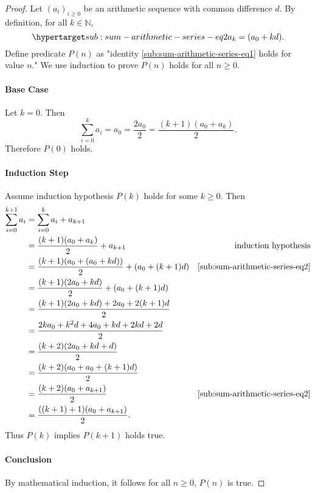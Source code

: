 \documentclass{article}
\begin{document}
  \begin{proof}

    Let $(a_i)_{i \geq 0}$ be an arithmetic sequence with common difference $d$.
    By definition, for all $k \in \mathbb{N}$,
      \begin{equation}
        \hyperlabel{sub:sum-arithmetic-series-eq2}
        a_k = (a_0 + kd).
      \end{equation}
    Define predicate $P(n)$ as "identity \eqref{sub:sum-arithmetic-series-eq1}
      holds for value $n$."
    We use induction to prove $P(n)$ holds for all $n \geq 0$.

    \paragraph{Base Case}%

      Let $k = 0$.
      Then $$\sum_{i=0}^k a_i = a_0 = \frac{2a_0}{2} =
        \frac{(k + 1)(a_0 + a_k)}{2}.$$
      Therefore $P(0)$ holds.

    \paragraph{Induction Step}%

      Assume induction hypothesis $P(k)$ holds for some $k \geq 0$.
      Then
        \begin{align*}
          \sum_{i=0}^{k+1} a_i
            & = \sum_{i=0}^k a_i + a_{k+1} \\
            & = \frac{(k + 1)(a_0 + a_k)}{2} + a_{k+1}
              & \text{induction hypothesis} \\
            & = \frac{(k + 1)(a_0 + (a_0 + kd))}{2} + (a_0 + (k + 1)d)
              & \eqref{sub:sum-arithmetic-series-eq2} \\
            & = \frac{(k + 1)(2a_0 + kd)}{2} + (a_0 + (k + 1)d) \\
            & = \frac{(k + 1)(2a_0 + kd) + 2a_0 + 2(k + 1)d}{2} \\
            & = \frac{2ka_0 + k^2d + 4a_0 + kd + 2kd + 2d}{2} \\
            & = \frac{(k + 2)(2a_0 + kd + d)}{2} \\
            & = \frac{(k + 2)(a_0 + a_0 + (k + 1)d)}{2} \\
            & = \frac{(k + 2)(a_0 + a_{k+1})}{2}
              & \eqref{sub:sum-arithmetic-series-eq2} \\
            & = \frac{((k + 1) + 1)(a_0 + a_{k+1})}{2}.
        \end{align*}
      Thus $P(k)$ implies $P(k + 1)$ holds true.

    \paragraph{Conclusion}%

      By mathematical induction, it follows for all $n \geq 0$, $P(n)$ is true.

  \end{proof}
\end{document}
